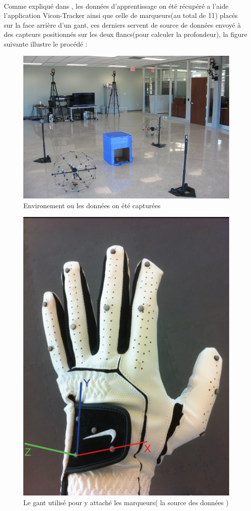 \paragraph{}
Comme expliqué dans \cite{datasetDetails}, les données d'apprentissage on été récupéré a l'aide l'application Vicon-Tracker \cite{vico} ainsi que celle de marqueurs(au total de 11) placés sur la face arrière d'un gant, ces derniers servent de source de données envoyé à des capteurs positionnés sur les deux flancs(pour calculer la profondeur), la figure suivante illustre le procédé : 
\begin{minipage}{0.5\linewidth}
	\begin{figure}[H]
		\centering
		\includegraphics[width=\linewidth]{images/cameras.png}
		\caption{\small Environement ou les données on été capturées \cite{datasetDetails}}
	\end{figure}
\end{minipage}
\begin{minipage}{0.5\linewidth}
	\begin{figure}[H]
		\centering
		\includegraphics[width=0.5\linewidth]{images/glove.png}
		\caption{\small  Le gant utilisé pour y attaché les marqueurs( la source des données ) \cite{datasetDetails}}
	\end{figure}
\end{minipage}
